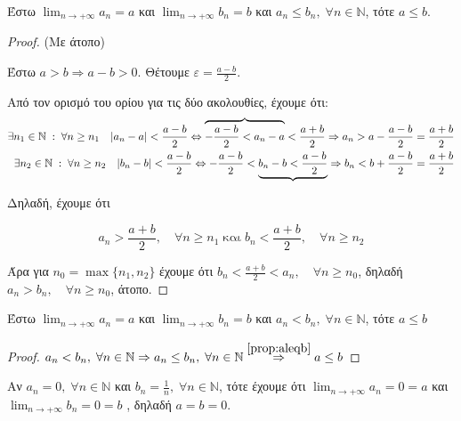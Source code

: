 \documentclass[a4paper,table]{report}
\begin{document}
\begin{mybox3}
  \begin{prop}\label{prop:aleqb}
    Έστω $ \lim_{n \to +\infty} a_{n} = a $ και $ 
    \lim_{n \to +\infty} b_{n} = b $ και
    $ a_{n} \leq b_{n}, \; \forall n \in \mathbb{N} $, τότε $ a \leq b $.
  \end{prop}
\end{mybox3}
\begin{proof}(Με άτοπο)
\item {}
  Έστω $ a>b \Rightarrow a-b>0 $. Θέτουμε $ \varepsilon = 
  \frac{a-b}{2} $.

  Από τον ορισμό του ορίου για τις δύο ακολουθίες, έχουμε ότι:
  \begin{align*}
    \exists n_{1} \in \mathbb{N} \; : \; \forall n \geq n_{1} 
    \quad \abs{a_{n}-a} < \frac{a-b}{2} \Leftrightarrow 
    \overbrace{- \frac{a-b}{2} < a_{n} - a} < \frac{a+b}{2} \Rightarrow a_{n} > a -
    \frac{a-b}{2} = \frac{a+b}{2} \\
    \exists n_{2} \in \mathbb{N} \; : \; \forall n \geq n_{2} 
    \quad \abs{b_{n}-b} < \frac{a-b}{2} \Leftrightarrow 
    - \frac{a-b}{2} < \underbrace{b_{n} - b < \frac{a-b}{2}} \Rightarrow b_{n} < b +
    \frac{a-b}{2} = \frac{a+b}{2} 
  \end{align*}

  Δηλαδή, έχουμε ότι

  \[ a_{n} >  \frac{a+b}{2}, \quad \forall n \geq n_{1} \; \text{και} \;  
  b_{n} <  \frac{a+b}{2}, \quad \forall n \geq n_{2}  \]

  Άρα για $ n_{0} = \max \{ n_{1}, n_{2} \} $ έχουμε ότι 
  $ b_{n} < \frac{a+b}{2} < a_{n}, \quad \forall n \geq n_{0} $, 
  δηλαδή $a_{n} > b_{n}, \quad \forall n \geq n_{0} $, άτοπο.
\end{proof}

\begin{mybox3}
  \begin{prop}
    Έστω $ \lim_{n \to +\infty} a_{n} = a $ και $ \lim_{n \to +\infty} 
    b_{n} = b $ και 
    $ a_{n} < b_{n}, \; \forall n \in \mathbb{N} $, τότε $ a \leq b $ 
  \end{prop}
\end{mybox3}
\begin{proof}
  $ a_{n}< b_{n}, \; \forall n \in \mathbb{N} \Rightarrow a_{n} \leq 
  b_{n}, \; \forall n \in \mathbb{N} \overset{\ref{prop:aleqb}}{\Rightarrow} 
  a \leq b $
\end{proof}

\begin{example}
\item {}
  Αν $ a_{n}=0, \; \forall n \in \mathbb{N} $
  και $ b_{n}= \frac{1}{n}, \; \forall n \in \mathbb{N} $, τότε έχουμε ότι 
  $ \lim_{n \to +\infty} a_{n} = 0 = a $ και 
  $ \lim_{n \to +\infty} b_{n} =  0 = b $ , δηλαδή $ a=b=0  $.
\end{example}
\end{document}
